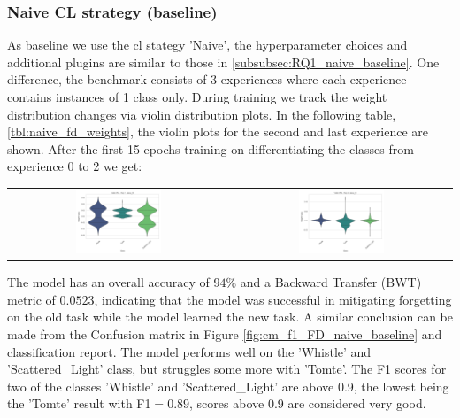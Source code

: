 \subsubsection{Naive CL strategy (baseline)}
\label{subsubsec:RQ2_naive}
As baseline we use the \acrshort{cl} stategy 'Naive', the hyperparameter choices and additional plugins are similar to those in \ref{subsubsec:RQ1_naive_baseline}. One difference, the benchmark consists of 3 experiences where each experience contains instances of 1 class only. 
During training we track the weight distribution changes via violin distribution plots. In the following table, \ref{tbl:naive_fd_weights}, the violin plots for the second and last experience are shown.
After the first 15 epochs training on differentiating the classes from experience 0 to 2 we get: 
\begin{center}
\begin{tabular}{cc}
\includegraphics[width=0.4\textwidth]{Images/naive_fd_exp_1.png} & \includegraphics[width=0.4\textwidth]{Images/naive_fd_exp_2.png} \\
\end{tabular}
\label{tbl:naive_fd_weights}
\end{center}
The model has an overall accuracy of $94 \%$ and a Backward Transfer (BWT) metric of $0.0523$, indicating that the model was successful in mitigating forgetting on the old task while the model learned the new task. A similar conclusion can be made from the Confusion matrix in Figure \ref{fig:cm_f1_FD_naive_baseline} and classification report. 
The model performs well on the 'Whistle' and 'Scattered\_Light' class, but struggles some more with 'Tomte'. The F1 scores for two of the classes 'Whistle' and 'Scattered\_Light' are above 0.9, the lowest being the 'Tomte' result with F1$=0.89$, scores above 0.9 are considered very good. 

